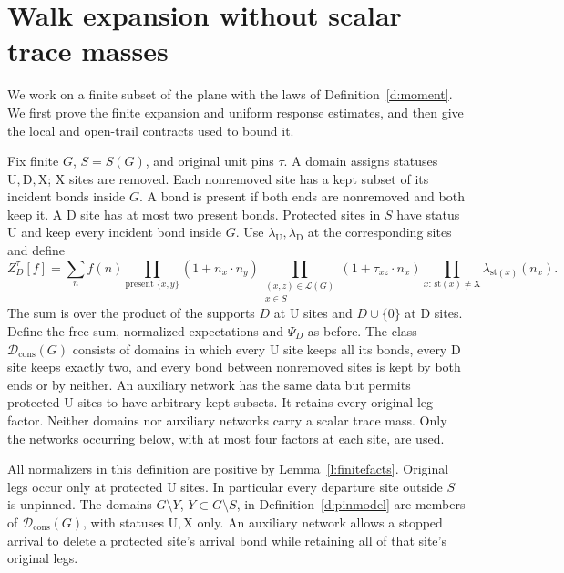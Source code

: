 \section{Walk expansion without scalar trace masses}\label{s:walks}

We work on a finite subset of the plane with the laws of
Definition~\ref{d:moment}. We first prove the finite expansion and
uniform response estimates, and then give the local and open-trail
contracts used to bound it.

\begin{definition}\label{d:domain}
Fix finite \(G\), \(S=S(G)\), and original unit pins \(\tau\).
A domain assigns statuses \(\mathrm U,\mathrm D,\mathrm X\);
\(\mathrm X\) sites are removed. Each nonremoved site has a kept
subset of its incident bonds inside \(G\). A bond is present if both
ends are nonremoved and both keep it. A \(\mathrm D\) site has at
most two present bonds. Protected sites in \(S\) have status
\(\mathrm U\) and keep every incident bond inside \(G\).
Use \(\lambda_{\mathrm U},\lambda_{\mathrm D}\) at the corresponding
sites and define
\[
 Z_D^\tau[f]=\sum_n f(n)
       \prod_{\text{present }\{x,y\}}(1+n_x\cdot n_y)
       \prod_{\substack{(x,z)\in\mathcal L(G)\\x\in S}}
                   (1+\tau_{xz}\cdot n_x)
       \prod_{x:\,\mathrm{st}(x)\ne\mathrm X}\lambda_{\mathrm{st}(x)}(n_x).
\]
The sum is over the product of the supports \(D\) at \(\mathrm U\)
sites and \(D\cup\{0\}\) at \(\mathrm D\) sites.
Define the free sum, normalized expectations and \(\Psi_D\) as before.
The class \(\mathcal D_{\mathrm{cons}}(G)\) consists of domains in
which every \(\mathrm U\) site keeps all its bonds, every \(\mathrm D\)
site keeps exactly two, and every bond between nonremoved sites is
kept by both ends or by neither.
An auxiliary network has the same data but permits protected
\(\mathrm U\) sites to have arbitrary kept subsets. It retains every
original leg factor. Neither domains nor auxiliary networks carry
a scalar trace mass. Only the networks occurring below, with at most
four factors at each site, are used.
\end{definition}

All normalizers in this definition are positive by
Lemma~\ref{l:finitefacts}. Original legs occur only at protected
\(\mathrm U\) sites. In particular every departure site outside
\(S\) is unpinned.
The domains \(G\setminus Y\), \(Y\subset G\setminus S\), in
Definition~\ref{d:pinmodel} are members of
\(\mathcal D_{\mathrm{cons}}(G)\), with statuses
\(\mathrm U,\mathrm X\) only.
An auxiliary network allows a stopped arrival to delete a protected
site's arrival bond while retaining all of that site's original legs.

